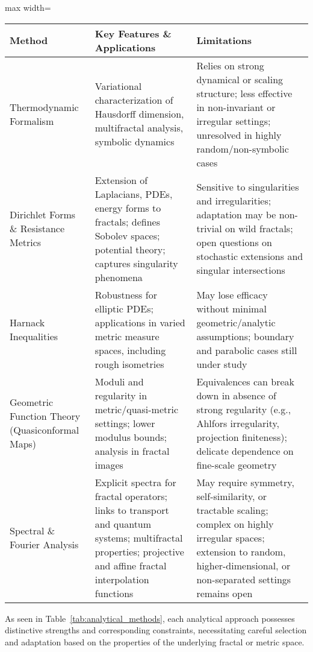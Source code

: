 \documentclass[sigconf]{acmart}
\begin{document}
\begin{table*}[htbp]
\centering
\caption{Comparative Overview of Analytical Techniques for Fractal and Metric Spaces}
\label{tab:analytical_methods}
\begin{adjustbox}{max width=\textwidth}
\begin{tabular}{lll}
\toprule
\textbf{Method} & \textbf{Key Features \& Applications} & \textbf{Limitations} \\
\midrule
Thermodynamic Formalism & Variational characterization of Hausdorff dimension, multifractal analysis, symbolic dynamics~\cite{ref38,ref13} & Relies on strong dynamical or scaling structure; less effective in non-invariant or irregular settings; unresolved in highly random/non-symbolic cases \\
Dirichlet Forms \& Resistance Metrics & Extension of Laplacians, PDEs, energy forms to fractals; defines Sobolev spaces; potential theory; captures singularity phenomena~\cite{ref13,ref43,ref40} & Sensitive to singularities and irregularities; adaptation may be non-trivial on wild fractals; open questions on stochastic extensions and singular intersections \\
Harnack Inequalities & Robustness for elliptic PDEs; applications in varied metric measure spaces, including rough isometries~\cite{ref38,ref40} & May lose efficacy without minimal geometric/analytic assumptions; boundary and parabolic cases still under study \\
Geometric Function Theory (Quasiconformal Maps) & Moduli and regularity in metric/quasi-metric settings; lower modulus bounds; analysis in fractal images~\cite{ref47} & Equivalences can break down in absence of strong regularity (e.g., Ahlfors irregularity, projection finiteness); delicate dependence on fine-scale geometry \\
Spectral \& Fourier Analysis & Explicit spectra for fractal operators; links to transport and quantum systems; multifractal properties; projective and affine fractal interpolation functions~\cite{ref28,ref32,ref33,ref34} & May require symmetry, self-similarity, or tractable scaling; complex on highly irregular spaces; extension to random, higher-dimensional, or non-separated settings remains open \\
\bottomrule
\end{tabular}
\end{adjustbox}
\end{table*}

As seen in Table~\ref{tab:analytical_methods}, each analytical approach possesses distinctive strengths and corresponding constraints, necessitating careful selection and adaptation based on the properties of the underlying fractal or metric space.
\end{document}
